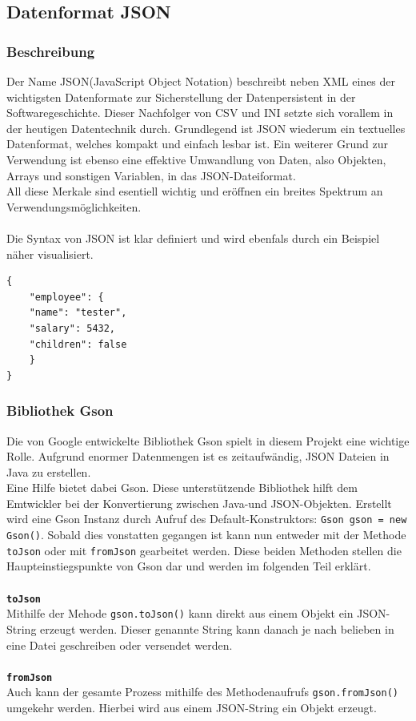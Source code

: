 \subsection{Datenformat JSON}\label{subsec:json}

\subsubsection{Beschreibung}
Der Name JSON(JavaScript Object Notation) beschreibt neben XML eines der wichtigsten Datenformate zur Sicherstellung der Datenpersistent in der Softwaregeschichte.
Dieser Nachfolger von CSV und INI setzte sich vorallem in der heutigen Datentechnik durch.
Grundlegend ist JSON wiederum ein textuelles Datenformat, welches kompakt und einfach lesbar ist.
Ein weiterer Grund zur Verwendung ist ebenso eine effektive Umwandlung von Daten, also Objekten, Arrays und sonstigen Variablen,  in das JSON-Dateiformat.\\
All diese Merkale sind esentiell wichtig und eröffnen ein breites Spektrum an Verwendungsmöglichkeiten.\\\\
Die Syntax von JSON ist klar definiert und wird ebenfals durch ein Beispiel näher visualisiert.
\begin{lstlisting}[style=json, caption=JSON-Codebeispiel,label=jsonExample]
{
    "employee": {
    "name": "tester",
    "salary": 5432,
    "children": false
    }
}
\end{lstlisting}
\subsubsection{Bibliothek Gson}
Die von Google entwickelte Bibliothek Gson spielt in diesem Projekt eine wichtige Rolle.
Aufgrund enormer Datenmengen ist es zeitaufwändig, JSON Dateien in Java zu erstellen.\\
Eine Hilfe bietet dabei Gson.
Diese unterstützende Bibliothek hilft dem Emtwickler bei der Konvertierung zwischen Java-und JSON-Objekten.
Erstellt wird eine Gson Instanz durch Aufruf des Default-Konstruktors: \lstinline[style=java]{Gson gson = new Gson()}.
Sobald dies vonstatten gegangen ist kann nun entweder mit der Methode \lstinline{toJson} oder mit \lstinline{fromJson} gearbeitet werden.
Diese beiden Methoden stellen die Haupteinstiegspunkte von Gson dar und werden im folgenden Teil erklärt.
\\\\
\textbf{\lstinline{toJson}}
\\
Mithilfe der Mehode \lstinline[style=java]{gson.toJson()} kann direkt aus einem Objekt ein JSON-String erzeugt werden.
Dieser genannte String kann danach je nach belieben in eine Datei geschreiben oder versendet werden.
\\\\
\textbf{\lstinline{fromJson}}
\\
Auch kann der gesamte Prozess mithilfe des Methodenaufrufs \lstinline[style=java]{gson.fromJson()} umgekehr werden.
Hierbei wird aus einem JSON-String ein Objekt erzeugt.
\\
